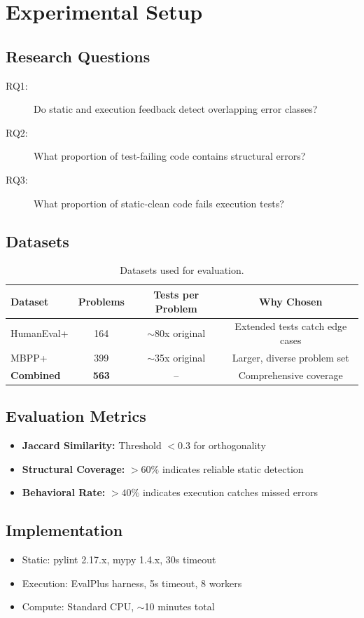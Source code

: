 \section{Experimental Setup}
\label{sec:setup}

\subsection{Research Questions}

\begin{description}
    \item[RQ1:] Do static and execution feedback detect overlapping error classes?
    \item[RQ2:] What proportion of test-failing code contains structural errors?
    \item[RQ3:] What proportion of static-clean code fails execution tests?
\end{description}

\subsection{Datasets}

\begin{table}[h]
\centering
\begin{tabular}{lccc}
\toprule
\textbf{Dataset} & \textbf{Problems} & \textbf{Tests per Problem} & \textbf{Why Chosen} \\
\midrule
HumanEval+ & 164 & $\sim$80x original & Extended tests catch edge cases \\
MBPP+ & 399 & $\sim$35x original & Larger, diverse problem set \\
\textbf{Combined} & \textbf{563} & -- & Comprehensive coverage \\
\bottomrule
\end{tabular}
\caption{Datasets used for evaluation.}
\label{tab:datasets}
\end{table}

\subsection{Evaluation Metrics}

\begin{itemize}
    \item \textbf{Jaccard Similarity:} Threshold $< 0.3$ for orthogonality
    \item \textbf{Structural Coverage:} $> 60\%$ indicates reliable static detection
    \item \textbf{Behavioral Rate:} $> 40\%$ indicates execution catches missed errors
\end{itemize}

\subsection{Implementation}

\begin{itemize}
    \item Static: pylint 2.17.x, mypy 1.4.x, 30s timeout
    \item Execution: EvalPlus harness, 5s timeout, 8 workers
    \item Compute: Standard CPU, $\sim$10 minutes total
\end{itemize}
